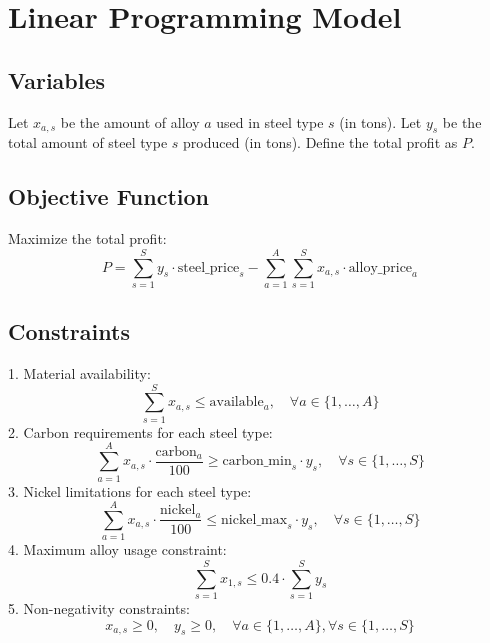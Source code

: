 \documentclass{article}
\begin{document}
\section*{Linear Programming Model}

\subsection*{Variables}
Let \( x_{a,s} \) be the amount of alloy \( a \) used in steel type \( s \) (in tons).  
Let \( y_s \) be the total amount of steel type \( s \) produced (in tons).  
Define the total profit as \( P \).

\subsection*{Objective Function}
Maximize the total profit:
\[
P = \sum_{s=1}^{S} y_s \cdot \text{steel\_price}_s - \sum_{a=1}^{A} \sum_{s=1}^{S} x_{a,s} \cdot \text{alloy\_price}_a
\]

\subsection*{Constraints}
1. Material availability:
\[
\sum_{s=1}^{S} x_{a,s} \leq \text{available}_{a}, \quad \forall a \in \{1, \ldots, A\}
\]
2. Carbon requirements for each steel type:
\[
\sum_{a=1}^{A} x_{a,s} \cdot \frac{\text{carbon}_a}{100} \geq \text{carbon\_min}_{s} \cdot y_s, \quad \forall s \in \{1, \ldots, S\}
\]
3. Nickel limitations for each steel type:
\[
\sum_{a=1}^{A} x_{a,s} \cdot \frac{\text{nickel}_a}{100} \leq \text{nickel\_max}_{s} \cdot y_s, \quad \forall s \in \{1, \ldots, S\}
\]
4. Maximum alloy usage constraint:
\[
\sum_{s=1}^{S} x_{1,s} \leq 0.4 \cdot \sum_{s=1}^{S} y_s
\]
5. Non-negativity constraints:
\[
x_{a,s} \geq 0, \quad y_s \geq 0, \quad \forall a \in \{1, \ldots, A\}, \forall s \in \{1, \ldots, S\}
\]
\end{document}

